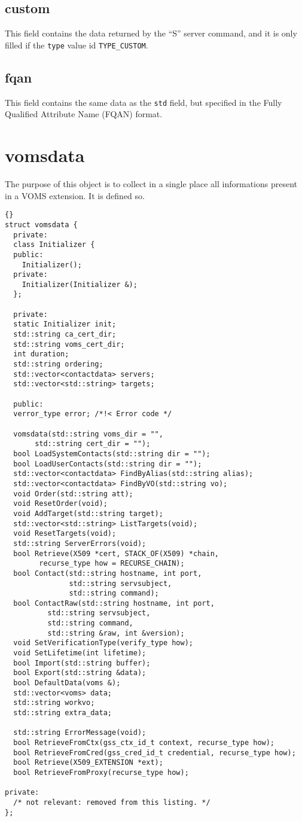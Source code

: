 \documentclass[a4paper]{book}
\begin{document}
\subsection{custom}
This field contains the data returned by the ``S'' server command, and
it is only filled if the \texttt{type} value id \texttt{TYPE\_CUSTOM}.

\subsection{fqan}
This field contains the same data as the \texttt{std} field, but
specified in the Fully Qualified Attribute Name (FQAN) format.

\section{vomsdata}
The purpose of this object is to collect in a single place all
informations present in a VOMS extension. It is defined so.

\begin{lstlisting}{}
struct vomsdata {
  private:
  class Initializer {
  public:
    Initializer();
  private:
    Initializer(Initializer &);
  };

  private:
  static Initializer init;
  std::string ca_cert_dir;
  std::string voms_cert_dir;
  int duration;
  std::string ordering;
  std::vector<contactdata> servers;
  std::vector<std::string> targets;

  public:
  verror_type error; /*!< Error code */

  vomsdata(std::string voms_dir = "", 
	   std::string cert_dir = "");
  bool LoadSystemContacts(std::string dir = "");
  bool LoadUserContacts(std::string dir = "");
  std::vector<contactdata> FindByAlias(std::string alias);
  std::vector<contactdata> FindByVO(std::string vo);
  void Order(std::string att);
  void ResetOrder(void);
  void AddTarget(std::string target);
  std::vector<std::string> ListTargets(void);
  void ResetTargets(void);
  std::string ServerErrors(void);
  bool Retrieve(X509 *cert, STACK_OF(X509) *chain, 
		recurse_type how = RECURSE_CHAIN);
  bool Contact(std::string hostname, int port, 
               std::string servsubject, 
               std::string command);
  bool ContactRaw(std::string hostname, int port, 
		  std::string servsubject, 
		  std::string command,
		  std::string &raw, int &version);
  void SetVerificationType(verify_type how);
  void SetLifetime(int lifetime);
  bool Import(std::string buffer);
  bool Export(std::string &data);
  bool DefaultData(voms &);
  std::vector<voms> data;
  std::string workvo;
  std::string extra_data;

  std::string ErrorMessage(void);
  bool RetrieveFromCtx(gss_ctx_id_t context, recurse_type how);
  bool RetrieveFromCred(gss_cred_id_t credential, recurse_type how);
  bool Retrieve(X509_EXTENSION *ext);
  bool RetrieveFromProxy(recurse_type how);

private:
  /* not relevant: removed from this listing. */
};
\end{lstlisting}
\end{document}
